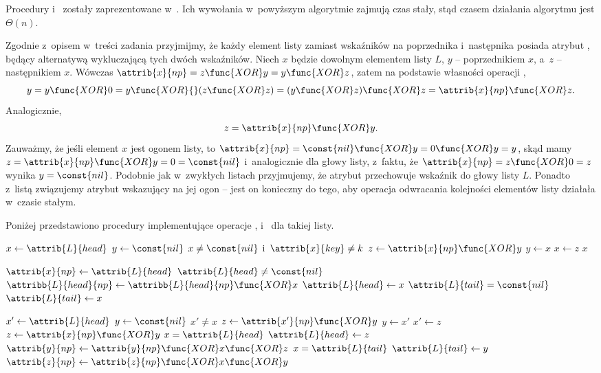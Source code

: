 Procedury  i~ zostały zaprezentowane w~.
Ich wywołania w~powyższym algorytmie zajmują czas stały, stąd czasem działania algorytmu jest $\Theta(n)$.

\exercise %
Zgodnie z~opisem w~treści zadania przyjmijmy, że każdy element listy zamiast wskaźników na poprzednika i~następnika posiada atrybut , będący alternatywą wykluczającą tych dwóch wskaźników.
Niech $x$ będzie dowolnym elementem listy $L$, $y$ -- poprzednikiem $x$, a~$z$ -- następnikiem $x$.
Wówczas $\attrib{x}{np}=z\func{XOR}y=y\func{XOR}z$, zatem na podstawie własności operacji ,
\[
	y = y\func{XOR}0 = y\func{XOR}{}(z\func{XOR}z) = (y\func{XOR}z)\func{XOR}z = \attrib{x}{np}\func{XOR}z.
\]
Analogicznie,
\[
	z = \attrib{x}{np}\func{XOR}y.
\]
Zauważmy, że jeśli element $x$ jest ogonem listy, to $\attrib{x}{np}=\const{nil}\func{XOR}y=0\func{XOR}y=y$, skąd mamy $z=\attrib{x}{np}\func{XOR}y=0=\const{nil}$ i~analogicznie dla głowy listy, z~faktu, że $\attrib{x}{np}=z\func{XOR}0=z$ wynika $y=\const{nil}$.
Podobnie jak w~zwykłych listach przyjmujemy, że atrybut  przechowuje wskaźnik do głowy listy $L$.
Ponadto z~listą związujemy atrybut  wskazujący na jej ogon -- jest on konieczny do tego, aby operacja odwracania kolejności elementów listy działała w~czasie stałym.

Poniżej przedstawiono procedury implementujące operacje ,  i~ dla takiej listy.
\begin{codebox}
\li	$x\gets\attrib{L}{head}$
\li	$y\gets\const{nil}$
\li	\While $x\ne\const{nil}$ i~$\attrib{x}{key}\ne k$
\li		\Do $z\gets\attrib{x}{np}\func{XOR}y$
\li			$y\gets x$
\li			$x\gets z$
		\End
\li	\Return $x$
\end{codebox}

\begin{codebox}
\li	$\attrib{x}{np}\gets\attrib{L}{head}$
\li	\If $\attrib{L}{head}\ne\const{nil}$
\li		\Then $\attribb{L}{head}{np}\gets\attribb{L}{head}{np}\func{XOR}x$
		\End
\li	$\attrib{L}{head}\gets x$
\li	\If $\attrib{L}{tail}=\const{nil}$
\li		\Then $\attrib{L}{tail}\gets x$
		\End
\end{codebox}

\begin{codebox}
\li	$x'\gets\attrib{L}{head}$
\li	$y\gets\const{nil}$
\li	\While $x'\ne x$
\li		\Do $z\gets\attrib{x'}{np}\func{XOR}y$
\li			$y\gets x'$
\li			$x'\gets z$
		\End
\li	$z\gets\attrib{x}{np}\func{XOR}y$
\li	\If $x=\attrib{L}{head}$
\li		\Then $\attrib{L}{head}\gets z$
\li		\Else $\attrib{y}{np}\gets\attrib{y}{np}\func{XOR}x\func{XOR}z$
		\End
\li	\If $x=\attrib{L}{tail}$
\li		\Then $\attrib{L}{tail}\gets y$
\li		\Else $\attrib{z}{np}\gets\attrib{z}{np}\func{XOR}x\func{XOR}y$
		\End
\end{codebox}

